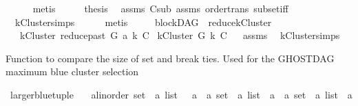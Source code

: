 \begin{isabellebody}
\ \ \ \ \isamarkupfalse%
\ metis\isanewline
\ \ \isamarkupfalse%
\ \isamarkupfalse%
\ {\isacharquery}{\kern0pt}thesis\ \isamarkupfalse%
\ assms{\isacharparenleft}{\kern0pt}{}{\isacharparenright}{\kern0pt}\ C{\isacharprime}{\kern0pt}{\isacharunderscore}{\kern0pt}sub\ assms{\isacharparenleft}{\kern0pt}{}{\isacharparenright}{\kern0pt}\ order{\isachardot}{\kern0pt}trans\ subset{\isacharunderscore}{\kern0pt}iff\isanewline
\ \ \ \ \isamarkupfalse%
\ \ kCluster{\isachardot}{\kern0pt}simps\isanewline
\ \ \ \ \isamarkupfalse%
\ metis\ \ \ \isanewline
{}\isamarkupfalse%
%
\endisatagproof
{\isafoldproof}%
%
\isadelimproof
\isanewline
%
\endisadelimproof
\isanewline
\isanewline
{}\isamarkupfalse%
\ {\isacharparenleft}{\kern0pt}\ blockDAG{\isacharparenright}{\kern0pt}\ \ reduce{\isacharunderscore}{\kern0pt}kCluster{\isacharcolon}{\kern0pt}\isanewline
\ \ \ {\isachardoublequoteopen}kCluster\ {\isacharparenleft}{\kern0pt}reduce{\isacharunderscore}{\kern0pt}past\ G\ a{\isacharparenright}{\kern0pt}\ k\ C{\isachardoublequoteclose}\isanewline
{}\ {\isachardoublequoteopen}kCluster\ G\ k\ C{\isachardoublequoteclose}%
\isadelimproof
\ %
\endisadelimproof
%
\isatagproof
{}\isamarkupfalse%
\ assms\ \isamarkupfalse%
\ kCluster{\isachardot}{\kern0pt}simps\ \isamarkupfalse%
%
\endisatagproof
{\isafoldproof}%
%
\isadelimproof
%
\endisadelimproof
%
\begin{isamarkuptext}%
Function to compare the size of set and break ties. Used for the GHOSTDAG maximum blue 
      cluster selection%
\end{isamarkuptext}\isamarkuptrue%
\isamarkupfalse%
\ larger{\isacharunderscore}{\kern0pt}blue{\isacharunderscore}{\kern0pt}tuple\ {\isacharcolon}{\kern0pt}{\isacharcolon}{\kern0pt}\isanewline
\ \ {\isachardoublequoteopen}{\isacharparenleft}{\kern0pt}{\isacharparenleft}{\kern0pt}{\isacharprime}{\kern0pt}a{\isacharcolon}{\kern0pt}{\isacharcolon}{\kern0pt}linorder\ set\ {\isasymtimes}\ {\isacharprime}{\kern0pt}a\ list{\isacharparenright}{\kern0pt}\ \ {\isasymtimes}\ {\isacharprime}{\kern0pt}a{\isacharparenright}{\kern0pt}\ {\isasymRightarrow}\ {\isacharparenleft}{\kern0pt}{\isacharparenleft}{\kern0pt}{\isacharprime}{\kern0pt}a\ set\ {\isasymtimes}\ {\isacharprime}{\kern0pt}a\ list{\isacharparenright}{\kern0pt}\ {\isasymtimes}\ {\isacharprime}{\kern0pt}a{\isacharparenright}{\kern0pt}\ {\isasymRightarrow}\ {\isacharparenleft}{\kern0pt}{\isacharparenleft}{\kern0pt}{\isacharprime}{\kern0pt}a\ set\ {\isasymtimes}\ {\isacharprime}{\kern0pt}a\ list{\isacharparenright}{\kern0pt}\ {\isasymtimes}\ {\isacharprime}{\kern0pt}a{\isacharparenright}{\kern0pt}{\isachardoublequoteclose}\isanewline

\end{isabellebody}
